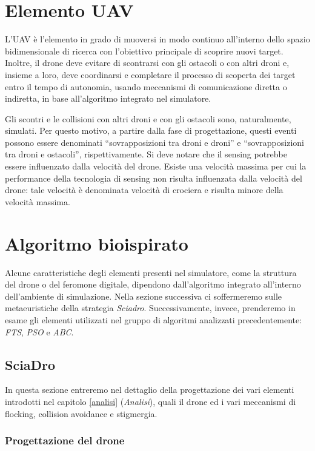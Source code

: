 \section {Elemento UAV}

L'UAV è l'elemento in grado di muoversi in modo continuo all’interno dello spazio bidimensionale di ricerca con l’obiettivo principale di scoprire nuovi target. 
Inoltre, il drone deve evitare di scontrarsi con gli ostacoli o con altri droni e, insieme a loro, deve coordinarsi e completare il processo di scoperta dei target entro il tempo di autonomia, usando meccanismi di comunicazione diretta o indiretta, in base all’algoritmo integrato nel simulatore. 

Gli scontri e le collisioni con altri droni e con gli ostacoli sono, naturalmente, simulati. 
Per questo motivo, a partire dalla fase di progettazione, questi eventi possono essere denominati “sovrapposizioni tra droni e droni” e “sovrapposizioni tra droni e ostacoli”, rispettivamente. 
Si deve notare che il sensing potrebbe essere influenzato dalla velocità del drone. 
Esiste una velocità massima per cui la performance della tecnologia di sensing non risulta influenzata dalla velocità del drone: tale velocità è denominata velocità di crociera e risulta minore della velocità massima.

\section {Algoritmo bioispirato}

Alcune caratteristiche degli elementi presenti nel simulatore, come la struttura del drone o del feromone digitale, dipendono dall'algoritmo integrato all'interno dell'ambiente di simulazione.
Nella sezione successiva ci soffermeremo sulle metaeuristiche della strategia \textit{Sciadro}.
Successivamente, invece, prenderemo in esame gli elementi utilizzati nel gruppo di algoritmi analizzati precedentemente: \textit{FTS}, \textit{PSO} e \textit{ABC}.

\subsection{SciaDro}

In questa sezione entreremo nel dettaglio della progettazione dei vari elementi introdotti nel capitolo \ref{analisi} (\textit{Analisi}), quali il drone ed i vari meccanismi di flocking, collision avoidance e stigmergia.

\subsubsection{Progettazione del drone}

